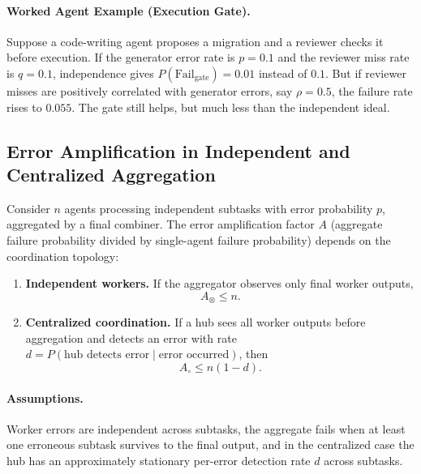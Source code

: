 \paragraph{Worked Agent Example (Execution Gate).}
Suppose a code-writing agent proposes a migration and a reviewer checks it before execution. If the
generator error rate is $p=0.1$ and the reviewer miss rate is $q=0.1$, independence gives
$P(\mathrm{Fail}_{\mathrm{gate}})=0.01$ instead of $0.1$. But if reviewer misses are positively correlated
with generator errors, say $\rho=0.5$, the failure rate rises to $0.055$. The gate still helps, but much
less than the independent ideal.

\subsection{Error Amplification in Independent and Centralized Aggregation}

\begin{theorem}
\label{thm:error-amplification}
Consider $n$ agents processing independent subtasks with error probability $p$, aggregated by a final
combiner. The error amplification factor $A$ (aggregate failure probability divided by single-agent
failure probability) depends on the coordination topology:
\begin{enumerate}[leftmargin=*]
\item[(a)] \textbf{Independent workers.} If the aggregator observes only final worker outputs,
\begin{equation}
A_{\otimes} \le n.
\label{eq:error-amp-independent}
\end{equation}
\item[(b)] \textbf{Centralized coordination.} If a hub sees all worker outputs before aggregation and detects
an error with rate $d = P(\text{hub detects error} \mid \text{error occurred})$, then
\begin{equation}
A_{\circ} \le n(1-d).
\label{eq:error-amp-centralized}
\end{equation}
\end{enumerate}
\end{theorem}

\paragraph{Assumptions.}
Worker errors are independent across subtasks, the aggregate fails when at least one erroneous subtask
survives to the final output, and in the centralized case the hub has an approximately stationary
per-error detection rate $d$ across subtasks.

